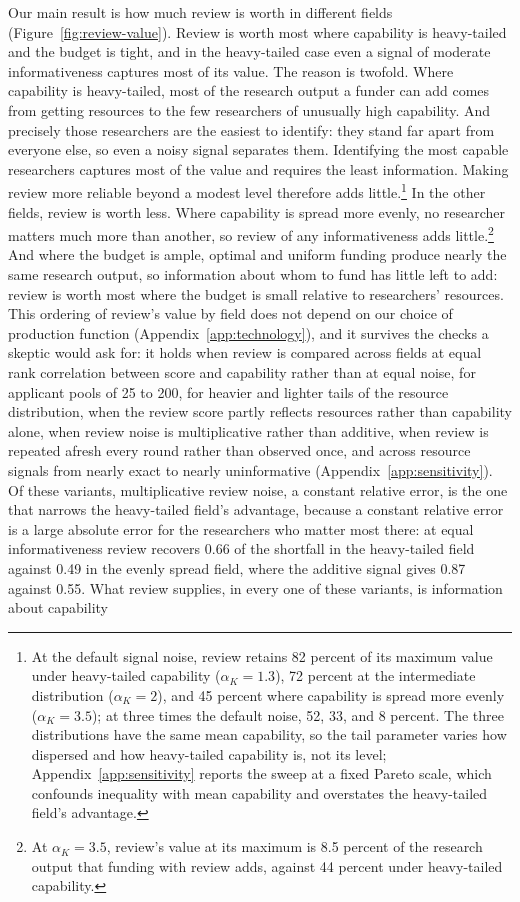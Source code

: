 \documentclass[article, 11pt, reqno]{amsart}
\theoremstyle{named}
\begin{document}


Our main result is how much review is worth in different fields (Figure~\ref{fig:review-value}). Review is worth most where capability is heavy-tailed and the budget is tight, and in the heavy-tailed case even a signal of moderate informativeness captures most of its value. The reason is twofold. Where capability is heavy-tailed, most of the research output a funder can add comes from getting resources to the few researchers of unusually high capability. And precisely those researchers are the easiest to identify: they stand far apart from everyone else, so even a noisy signal separates them. Identifying the most capable researchers captures most of the value and requires the least information. Making review more reliable beyond a modest level therefore adds little.\footnote{At the default signal noise, review retains 82 percent of its maximum value under heavy-tailed capability ($\alpha_K = 1.3$), 72 percent at the intermediate distribution ($\alpha_K = 2$), and 45 percent where capability is spread more evenly ($\alpha_K = 3.5$); at three times the default noise, 52, 33, and 8 percent. The three distributions have the same mean capability, so the tail parameter varies how dispersed and how heavy-tailed capability is, not its level; Appendix~\ref{app:sensitivity} reports the sweep at a fixed Pareto scale, which confounds inequality with mean capability and overstates the heavy-tailed field's advantage.} In the other fields, review is worth less. Where capability is spread more evenly, no researcher matters much more than another, so review of any informativeness adds little.\footnote{At $\alpha_K = 3.5$, review's value at its maximum is 8.5 percent of the research output that funding with review adds, against 44 percent under heavy-tailed capability.} And where the budget is ample, optimal and uniform funding produce nearly the same research output, so information about whom to fund has little left to add: review is worth most where the budget is small relative to researchers' resources. This ordering of review's value by field does not depend on our choice of production function (Appendix~\ref{app:technology}), and it survives the checks a skeptic would ask for: it holds when review is compared across fields at equal rank correlation between score and capability rather than at equal noise, for applicant pools of 25 to 200, for heavier and lighter tails of the resource distribution, when the review score partly reflects resources rather than capability alone, when review noise is multiplicative rather than additive, when review is repeated afresh every round rather than observed once, and across resource signals from nearly exact to nearly uninformative (Appendix~\ref{app:sensitivity}). Of these variants, multiplicative review noise, a constant relative error, is the one that narrows the heavy-tailed field's advantage, because a constant relative error is a large absolute error for the researchers who matter most there: at equal informativeness review recovers 0.66 of the shortfall in the heavy-tailed field against 0.49 in the evenly spread field, where the additive signal gives 0.87 against 0.55. What review supplies, in every one of these variants, is information about capability 
\end{document}
